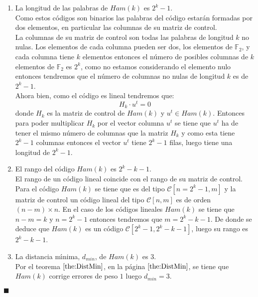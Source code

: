 \begin{enumerate}
\item La longitud de las palabras de $Ham(k)$ es $2^k-1$.\\

Como estos c\'odigos son binarios las palabras del c\'odigo estar\'an formadas
por dos elementos, en particular las columnas de su matriz de control.\\

La columnas de su matriz de control son todas las palabras de longitud $k$ no
nulas. Los elementos de cada columna pueden ser dos, los elementos de
$\mathbb{F}_2$, y cada columna tiene $k$ elementos entonces el n\'umero de
posibles columnas de $k$ elementos de $\mathbb{F}_2$ es $2^k$, como no estamos
considerando el elemento nulo entonces tendremos que el n\'umero de columnas no
nulas de longitud $k$ es de $2^k-1$.\\

Ahora bien, como el c\'odigo es lineal tendremos que:
\begin{displaymath}
H_k\cdot u^t = 0
\end{displaymath}
donde $H_k$ es la matriz de control de $Ham(k)$ y $u^t\in Ham(k)$. Entonces para
poder multiplicar $H_k$ por el vector columna $u^t$ se tiene que $u^t$ ha de
tener el mismo n\'umero de columnas que la matriz $H_k$ y como esta tiene
$2^k-1$ columnas entonces el vector $u^t$ tiene $2^k-1$ filas, luego tiene una
longitud de $2^k-1$.

\item El rango del c\'odigo $Ham(k)$ es $2^k-k-1$.\\

El rango de un c\'odigo lineal coincide con el rango de su matriz de control.
Para el c\'odigo $Ham(k)$ se tiene que es del tipo
$\mathcal{C}[n=2^k-1,m]$ y la matriz de control un c\'odigo lineal del tipo
$\mathcal{C}[n,m]$ es de orden $(n-m)\times n$. En el caso de los c\'odigos
lineales $Ham(k)$ se tiene que $n-m=k$ y $n=2^k-1$ entonces tendremos que
$m=2^k-k-1$. De donde se deduce que $Ham(k)$ es un c\'odigo
$\mathcal{C}[2^k-1,2^k-k-1]$, luego su rango es $2^k-k-1$.

\item La distancia m\'{\i}nima, $d_{min}$, de $Ham(k)$ es $3$.\\

Por el teorema $\ref{the:DistMin}$, en la p\'agina $\pageref{the:DistMin}$, se
tiene que $Ham(k)$ corrige errores de peso $1$ luego $d_{min} = 3$.
\end{enumerate}
\begin{flushright}
$\blacksquare$
\end{flushright}
%
\newpage
%
